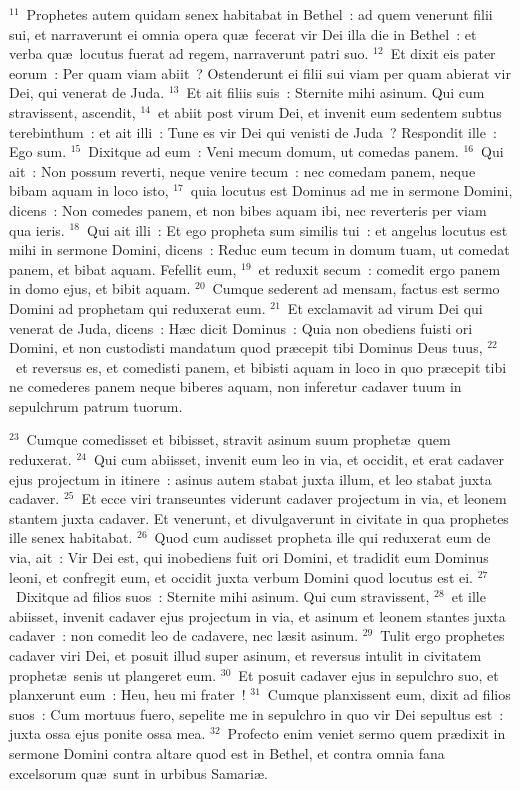 ${}^{11}$~Prophetes autem quidam senex habitabat in Bethel~: ad quem venerunt filii sui, et narraverunt ei omnia opera qu\ae\ fecerat vir Dei illa die in Bethel~: et verba qu\ae\ locutus fuerat ad regem, narraverunt patri suo.
${}^{12}$~Et dixit eis pater eorum~: Per quam viam abiit~? Ostenderunt ei filii sui viam per quam abierat vir Dei, qui venerat de Juda.
${}^{13}$~Et ait filiis suis~: Sternite mihi asinum. Qui cum stravissent, ascendit,
${}^{14}$~et abiit post virum Dei, et invenit eum sedentem subtus terebinthum~: et ait illi~: Tune es vir Dei qui venisti de Juda~? Respondit ille~: Ego sum.
${}^{15}$~Dixitque ad eum~: Veni mecum domum, ut comedas panem.
${}^{16}$~Qui ait~: Non possum reverti, neque venire tecum~: nec comedam panem, neque bibam aquam in loco isto,
${}^{17}$~quia locutus est Dominus ad me in sermone Domini, dicens~: Non comedes panem, et non bibes aquam ibi, nec reverteris per viam qua ieris.
${}^{18}$~Qui ait illi~: Et ego propheta sum similis tui~: et angelus locutus est mihi in sermone Domini, dicens~: Reduc eum tecum in domum tuam, ut comedat panem, et bibat aquam. Fefellit eum,
${}^{19}$~et reduxit secum~: comedit ergo panem in domo ejus, et bibit aquam.
${}^{20}$~Cumque sederent ad mensam, factus est sermo Domini ad prophetam qui reduxerat eum.
${}^{21}$~Et exclamavit ad virum Dei qui venerat de Juda, dicens~: H\ae c dicit Dominus~: Quia non obediens fuisti ori Domini, et non custodisti mandatum quod pr\ae cepit tibi Dominus Deus tuus,
${}^{22}$~et reversus es, et comedisti panem, et bibisti aquam in loco in quo pr\ae cepit tibi ne comederes panem neque biberes aquam, non inferetur cadaver tuum in sepulchrum patrum tuorum.


${}^{23}$~Cumque comedisset et bibisset, stravit asinum suum prophet\ae\ quem reduxerat.
${}^{24}$~Qui cum abiisset, invenit eum leo in via, et occidit, et erat cadaver ejus projectum in itinere~: asinus autem stabat juxta illum, et leo stabat juxta cadaver.
${}^{25}$~Et ecce viri transeuntes viderunt cadaver projectum in via, et leonem stantem juxta cadaver. Et venerunt, et divulgaverunt in civitate in qua prophetes ille senex habitabat.
${}^{26}$~Quod cum audisset propheta ille qui reduxerat eum de via, ait~: Vir Dei est, qui inobediens fuit ori Domini, et tradidit eum Dominus leoni, et confregit eum, et occidit juxta verbum Domini quod locutus est ei.
${}^{27}$~Dixitque ad filios suos~: Sternite mihi asinum. Qui cum stravissent,
${}^{28}$~et ille abiisset, invenit cadaver ejus projectum in via, et asinum et leonem stantes juxta cadaver~: non comedit leo de cadavere, nec l\ae sit asinum.
${}^{29}$~Tulit ergo prophetes cadaver viri Dei, et posuit illud super asinum, et reversus intulit in civitatem prophet\ae\ senis ut plangeret eum.
${}^{30}$~Et posuit cadaver ejus in sepulchro suo, et planxerunt eum~: Heu, heu mi frater~!
${}^{31}$~Cumque planxissent eum, dixit ad filios suos~: Cum mortuus fuero, sepelite me in sepulchro in quo vir Dei sepultus est~: juxta ossa ejus ponite ossa mea.
${}^{32}$~Profecto enim veniet sermo quem pr\ae dixit in sermone Domini contra altare quod est in Bethel, et contra omnia fana excelsorum qu\ae\ sunt in urbibus Samari\ae .


